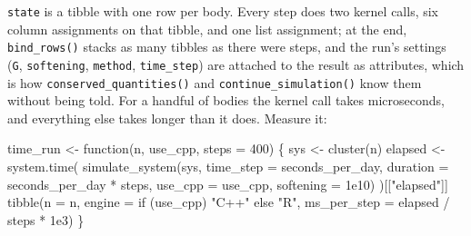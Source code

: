 \documentclass[
  10.5pt,
  letterpaper,
]{scrbook}
\newenvironment{Shaded}{\begin{snugshade}}{\end{snugshade}}
\newcommand{\AttributeTok}[1]{\textcolor[rgb]{0.00,0.00,0.00}{#1}}
\newcommand{\ControlFlowTok}[1]{\textcolor[rgb]{0.00,0.00,0.00}{#1}}
\newcommand{\DecValTok}[1]{\textcolor[rgb]{0.00,0.00,0.00}{#1}}
\newcommand{\FloatTok}[1]{\textcolor[rgb]{0.00,0.00,0.00}{#1}}
\newcommand{\FunctionTok}[1]{\textcolor[rgb]{0.00,0.00,0.00}{#1}}
\newcommand{\NormalTok}[1]{\textcolor[rgb]{0.00,0.00,0.00}{#1}}
\newcommand{\OtherTok}[1]{\textcolor[rgb]{0.00,0.00,0.00}{#1}}
\newcommand{\SpecialCharTok}[1]{\textcolor[rgb]{0.00,0.00,0.00}{#1}}
\newcommand{\StringTok}[1]{\textcolor[rgb]{0.00,0.00,0.00}{#1}}
\theoremstyle{definition}
\theoremstyle{plain}
\theoremstyle{remark}
\begin{document}
\texttt{state} is a tibble with one row per body. Every step does two
kernel calls, six column assignments on that tibble, and one list
assignment; at the end, \texttt{bind\_rows()} stacks as many tibbles as
there were steps, and the run's settings (\texttt{G},
\texttt{softening}, \texttt{method}, \texttt{time\_step}) are attached
to the result as attributes, which is how
\texttt{conserved\_quantities()} and \texttt{continue\_simulation()}
know them without being told. For a handful of bodies the kernel call
takes microseconds, and everything else takes longer than it does.
Measure it:

\begin{Shaded}
\begin{Highlighting}[]
\NormalTok{time\_run }\OtherTok{\textless{}{-}} \ControlFlowTok{function}\NormalTok{(n, use\_cpp, }\AttributeTok{steps =} \DecValTok{400}\NormalTok{) \{}
\NormalTok{  sys }\OtherTok{\textless{}{-}} \FunctionTok{cluster}\NormalTok{(n)}
\NormalTok{  elapsed }\OtherTok{\textless{}{-}} \FunctionTok{system.time}\NormalTok{(}
    \FunctionTok{simulate\_system}\NormalTok{(sys, }\AttributeTok{time\_step =}\NormalTok{ seconds\_per\_day,}
                    \AttributeTok{duration =}\NormalTok{ seconds\_per\_day }\SpecialCharTok{*}\NormalTok{ steps,}
                    \AttributeTok{use\_cpp =}\NormalTok{ use\_cpp, }\AttributeTok{softening =} \FloatTok{1e10}\NormalTok{)}
\NormalTok{  )[[}\StringTok{"elapsed"}\NormalTok{]]}
  \FunctionTok{tibble}\NormalTok{(}\AttributeTok{n =}\NormalTok{ n, }\AttributeTok{engine =} \ControlFlowTok{if}\NormalTok{ (use\_cpp) }\StringTok{"C++"} \ControlFlowTok{else} \StringTok{"R"}\NormalTok{,}
         \AttributeTok{ms\_per\_step =}\NormalTok{ elapsed }\SpecialCharTok{/}\NormalTok{ steps }\SpecialCharTok{*} \FloatTok{1e3}\NormalTok{)}
\NormalTok{\}}


\end{Highlighting}
\end{Shaded}
\end{document}
